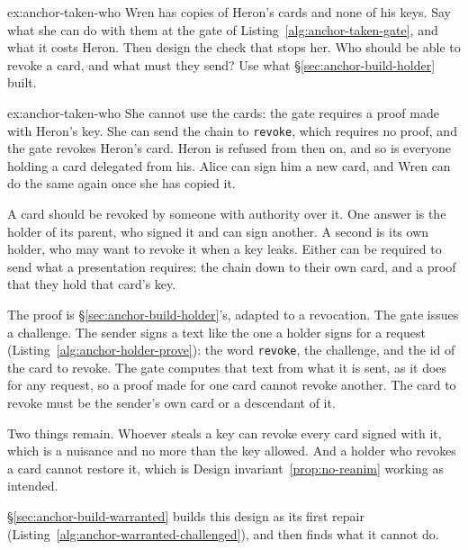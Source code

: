 \documentclass[11pt,a4paper]{article}
\theoremstyle{definition}
\begin{document}
\begin{pdexercise}[kind=Open,rating=3]{ex:anchor-taken-who}
Wren has copies of Heron's cards and none of his keys. Say what she can do with them at the gate of Listing~\ref{alg:anchor-taken-gate}, and what it costs Heron. Then design the check that stops her. Who should be able to revoke a card, and what must they send? Use what \S\ref{sec:anchor-build-holder} built.
\end{pdexercise}
\begin{pdsolution}{ex:anchor-taken-who}
She cannot use the cards: the gate requires a proof made with Heron's key. She can send the chain to \texttt{revoke}, which requires no proof, and the gate revokes Heron's card. Heron is refused from then on, and so is everyone holding a card delegated from his. Alice can sign him a new card, and Wren can do the same again once she has copied it.

A card should be revoked by someone with authority over it. One answer is the holder of its parent, who signed it and can sign another. A second is its own holder, who may want to revoke it when a key leaks. Either can be required to send what a presentation requires: the chain down to their own card, and a proof that they hold that card's key.

The proof is \S\ref{sec:anchor-build-holder}'s, adapted to a revocation. The gate issues a challenge. The sender signs a text like the one a holder signs for a request (Listing~\ref{alg:anchor-holder-prove}): the word \texttt{revoke}, the challenge, and the id of the card to revoke. The gate computes that text from what it is sent, as it does for any request, so a proof made for one card cannot revoke another. The card to revoke must be the sender's own card or a descendant of it.

Two things remain. Whoever steals a key can revoke every card signed with it, which is a nuisance and no more than the key allowed. And a holder who revokes a card cannot restore it, which is Design invariant~\ref{prop:no-reanim} working as intended.

\S\ref{sec:anchor-build-warranted} builds this design as its first repair (Listing~\ref{alg:anchor-warranted-challenged}), and then finds what it cannot do.
\end{pdsolution}
\end{document}

